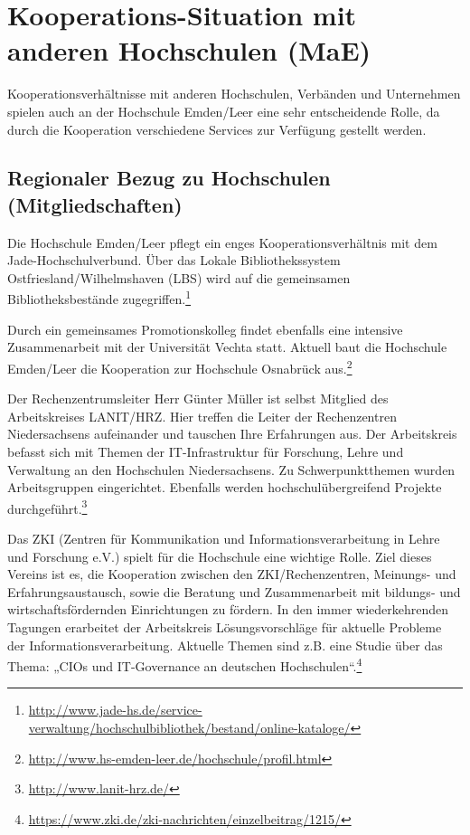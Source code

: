 \section{Kooperations-Situation mit anderen Hochschulen (MaE)}
\label{section_kooperations_situation}

Kooperationsverhältnisse mit anderen Hochschulen, Verbänden und Unternehmen spielen auch an der Hochschule Emden/Leer eine sehr entscheidende Rolle, da durch die Kooperation verschiedene Services zur Verfügung gestellt werden.

\subsection{Regionaler Bezug zu Hochschulen (Mitgliedschaften)}
Die Hochschule Emden/Leer pflegt ein enges Kooperationsverhältnis mit dem Jade-Hochschulverbund. Über das Lokale Bibliothekssystem Ostfriesland/Wilhelmshaven (LBS) wird auf die gemeinsamen  Bibliotheksbestände zugegriffen.\footnote{\url{http://www.jade-hs.de/service-verwaltung/hochschulbibliothek/bestand/online-kataloge/}}

Durch ein gemeinsames Promotionskolleg findet ebenfalls eine intensive Zusammenarbeit mit der Universität Vechta statt. Aktuell baut die Hochschule Emden/Leer die Kooperation zur Hochschule Osnabrück aus.\footnote{\url{http://www.hs-emden-leer.de/hochschule/profil.html}}

Der Rechenzentrumsleiter Herr Günter Müller ist selbst Mitglied des Arbeitskreises LANIT/HRZ. Hier treffen die Leiter der Rechenzentren Niedersachsens aufeinander und tauschen Ihre Erfahrungen aus. Der Arbeitskreis befasst sich mit Themen der IT-Infrastruktur für Forschung, Lehre und Verwaltung an den Hochschulen Niedersachsens. Zu Schwerpunktthemen wurden Arbeitsgruppen eingerichtet.  Ebenfalls werden hochschulübergreifend Projekte durchgeführt.\footnote{\url{http://www.lanit-hrz.de/}}

Das ZKI (Zentren für Kommunikation und Informationsverarbeitung in Lehre und Forschung e.V.) spielt für die Hochschule eine wichtige Rolle. Ziel dieses Vereins ist es, die Kooperation zwischen den ZKI/Rechenzentren, Meinungs- und Erfahrungsaustausch, sowie die Beratung und Zusammenarbeit mit bildungs- und wirtschaftsfördernden Einrichtungen zu fördern. In den immer wiederkehrenden Tagungen erarbeitet der Arbeitskreis Lösungsvorschläge für aktuelle Probleme der Informationsverarbeitung. Aktuelle Themen sind z.B. eine Studie über das Thema: „CIOs und IT-Governance an deutschen Hochschulen“.\footnote{\url{https://www.zki.de/zki-nachrichten/einzelbeitrag/1215/}}

